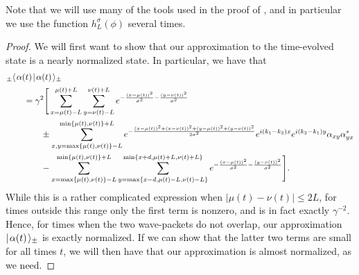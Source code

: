 \documentclass[../thesis-main/thesis-main]{subfiles}
\begin{document}
Note that we will use many of the tools used in the proof of , and in particular we use the function $h_L^\sigma(\phi)$ several times.

\begin{proof}
We will first want to show that our approximation to the time-evolved state is a nearly normalized state.  In particular, we have that
\begin{align}
  &{}_\pm\langle\mspace{2mu} \alpha(t) \mspace{2mu} | \mspace{2mu} \alpha(t)\mspace{2mu} \rangle_\pm \nonumber\\
  &\qquad = \gamma^2 \Bigg[\sum_{x=\mu(t)-L}^{\mu(t)+L} \sum_{y=\nu(t)-L}^{\nu(t)+L} e^{-\frac{(x-\mu(t))^2}{\sigma^2} - \frac{(y-\nu(t))^2}{\sigma^2}} \nonumber\\
  &\qquad \qquad \pm  \sum_{x,y=\max\{\mu(t),\nu(t)\}-L}^{\min\{\mu(t),\nu(t)\}+L} e^{-\frac{(x-\mu(t))^2 + (x-\nu(t))^2 + (y-\mu(t))^2+(y-\nu(t))^2}{2\sigma^2}}e^{i (k_1-k_2) x}e^{i(k_2-k_1)y} \alpha_{xy}\alpha_{yx}^* \nonumber\\
  &\qquad \qquad - \sum_{x=\max\{\mu(t),\nu(t)\}-L}^{\min\{\mu(t),\nu(t)\}+L}\sum_{y=\max\{x-d,\mu(t)-L,\nu(t)-L\}}^{\min\{x+d,\mu(t)+L,\nu(t)+L\}} e^{-\frac{(x-\mu(t))^2}{\sigma^2} - \frac{(y-\nu(t))^2}{\sigma^2}} \Bigg].\label{eq:approximation_ip}
\end{align}
While this is a rather complicated expression when $|\mu(t) - \nu(t)| \leq 2L$, for times outside this range only the first term is nonzero, and is in fact exactly $\gamma^{-2}$.  Hence, for times when the two wave-packets do not overlap, our approximation $|\mspace{2mu} \alpha(t) \mspace{2mu} \rangle_{\pm}$ is exactly normalized.  If we can show that the latter two terms are small for all times $t$, we will then have that our approximation is almost normalized, as we need.


\end{proof}
\end{document}
